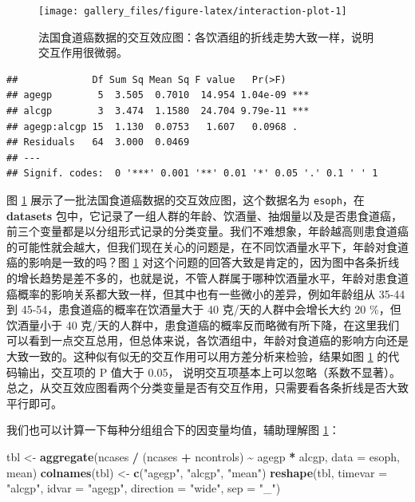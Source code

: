\documentclass[
  b5paper,
  UTF8,twoside]{book}
\newenvironment{Shaded}{\begin{snugshade}}{\end{snugshade}}
\newcommand{\AttributeTok}[1]{\textcolor[rgb]{0.13,0.29,0.53}{#1}}
\newcommand{\FunctionTok}[1]{\textcolor[rgb]{0.13,0.29,0.53}{\textbf{#1}}}
\newcommand{\NormalTok}[1]{#1}
\newcommand{\OtherTok}[1]{\textcolor[rgb]{0.56,0.35,0.01}{#1}}
\newcommand{\SpecialCharTok}[1]{\textcolor[rgb]{0.81,0.36,0.00}{\textbf{#1}}}
\newcommand{\StringTok}[1]{\textcolor[rgb]{0.31,0.60,0.02}{#1}}
\begin{document}
\begin{figure}

{\centering \texttt{[image: gallery\_files/figure-latex/interaction-plot-1]} 

}

\caption[法国食道癌数据的交互效应图]{法国食道癌数据的交互效应图：各饮酒组的折线走势大致一样，说明交互作用很微弱。}\label{fig:interaction-plot}
\end{figure}

\begin{verbatim}
##             Df Sum Sq Mean Sq F value   Pr(>F)    
## agegp        5  3.505  0.7010  14.954 1.04e-09 ***
## alcgp        3  3.474  1.1580  24.704 9.79e-11 ***
## agegp:alcgp 15  1.130  0.0753   1.607   0.0968 .  
## Residuals   64  3.000  0.0469                     
## ---
## Signif. codes:  0 '***' 0.001 '**' 0.01 '*' 0.05 '.' 0.1 ' ' 1
\end{verbatim}

图 \ref{fig:interaction-plot}
展示了一批法国食道癌数据的交互效应图，这个数据名为 \texttt{esoph}，在 \textbf{datasets} 包中，它记录了一组人群的年龄、饮酒量、抽烟量以及是否患食道癌，前三个变量都是以分组形式记录的分类变量。我们不难想象，年龄越高则患食道癌的可能性就会越大，但我们现在关心的问题是，在不同饮酒量水平下，年龄对食道癌的影响是一致的吗？图 \ref{fig:interaction-plot}
对这个问题的回答大致是肯定的，因为图中各条折线的增长趋势是差不多的，也就是说，不管人群属于哪种饮酒量水平，年龄对患食道癌概率的影响关系都大致一样，但其中也有一些微小的差异，例如年龄组从 35-44 到 45-54，患食道癌的概率在饮酒量大于 40 克/天的人群中会增长大约 20 \%，但饮酒量小于 40 克/天的人群中，患食道癌的概率反而略微有所下降，在这里我们可以看到一点交互总用，但总体来说，各饮酒组中，年龄对食道癌的影响方向还是大致一致的。这种似有似无的交互作用可以用方差分析来检验，结果如图 \ref{fig:interaction-plot}
的代码输出，交互项的 P 值大于 0.05，
说明交互项基本上可以忽略（系数不显著）。总之，从交互效应图看两个分类变量是否有交互作用，只需要看各条折线是否大致平行即可。

我们也可以计算一下每种分组组合下的因变量均值，辅助理解图 \ref{fig:interaction-plot}：

\begin{Shaded}
\begin{Highlighting}[]
\NormalTok{tbl }\OtherTok{\textless{}{-}} \FunctionTok{aggregate}\NormalTok{(ncases }\SpecialCharTok{/}\NormalTok{ (ncases }\SpecialCharTok{+}\NormalTok{ ncontrols) }\SpecialCharTok{\textasciitilde{}}\NormalTok{ agegp }\SpecialCharTok{*}\NormalTok{ alcgp, }\AttributeTok{data =}\NormalTok{ esoph, mean)}
\FunctionTok{colnames}\NormalTok{(tbl) }\OtherTok{\textless{}{-}} \FunctionTok{c}\NormalTok{(}\StringTok{"agegp"}\NormalTok{, }\StringTok{"alcgp"}\NormalTok{, }\StringTok{"mean"}\NormalTok{)}
\FunctionTok{reshape}\NormalTok{(tbl, }\AttributeTok{timevar =} \StringTok{"alcgp"}\NormalTok{, }\AttributeTok{idvar =} \StringTok{"agegp"}\NormalTok{, }\AttributeTok{direction =} \StringTok{"wide"}\NormalTok{, }\AttributeTok{sep =} \StringTok{"\_"}\NormalTok{)}
\end{Highlighting}
\end{Shaded}
\end{document}
